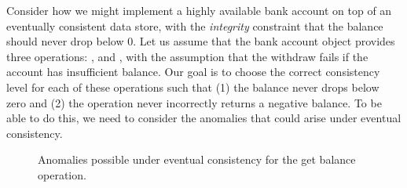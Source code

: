 Consider how we might implement a highly available bank account on top of an
eventually consistent data store, with the \emph{integrity} constraint that the
balance should never drop below 0. Let us assume that the bank account object
provides three operations: ,  and ,
with the assumption that the withdraw fails if the account has insufficient
balance. Our goal is to choose the correct consistency level for each of these
operations such that (1) the balance never drops below zero and (2) the
 operation never incorrectly returns a negative balance. To be
able to do this, we need to consider the anomalies that could arise under
eventual consistency.

\begin{figure}
\centering
{}
\hfill
{}
\hfill
{}
\caption{Anomalies possible under eventual consistency for the get balance operation.}
\label{fig:cleanliness_examples}
\end{figure}

